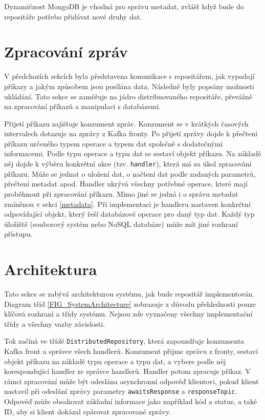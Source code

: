 Dynamičnost MongoDB je vhodná pro správu metadat, zvlášť když bude do repositáře potřeba přidávat nové druhy dat.

\section{Zpracování zpráv}
V předchozích sekcích byla představena komunikace s repositářem, jak vypadají příkazy a jakým způsobem jsou posílána data. Následně byly popsány možnosti ukládání. Tato sekce se zaměřuje na jádro distribuovaného repositáře, převážně na zpracování příkazů a manipulaci s  databázemi.

Přijetí příkazu zajišťuje konzument zpráv. Konzument se v krátkých časových intervalech dotazuje na zprávy z Kafka fronty. Po přijetí zprávy dojde k přečtení příkazu určeného typem operace a typem dat společně s dodatečnými informacemi. Podle typu operace a typu dat se sestaví objekt příkazu. Na základě něj dojde k výběru konkrétní akce (tzv. \texttt{handler}), která má za úkol zpracování příkazu. Může se jednat o uložení dat, o načtení dat podle zadaných parametrů, přečtení metadat apod. Handler ukrývá všechny potřebné operace, které mají proběhnout při zpracování příkazu. Mimo jiné se jedná i o správu metadat zmíněnou v sekci \ref{metadata}. Při implementaci je handleru nastaven konkrétní odpovídající objekt, který řeší databázové operace pro daný typ dat. Každý typ úložiště (souborový systém nebo NoSQL databáze) může mít jiné rozhraní přístupu.

\section{Architektura} \label{archSection}
Tato sekce se zabývá architekturou systému, jak bude repositář implementován. Diagram tříd \ref{FIG_SystemArchitecture} zobrazuje z důvodu přehlednosti pouze klíčová rozhraní a třídy systému. Nejsou zde vyznačeny všechny implementační třídy a všechny vazby závislosti.

Tok začíná ve třídě \texttt{DistributedRepository}, která zapouzdřuje konzumenta Kafka front a správce všech handlerů. Konzument přijme zprávu z fronty, sestaví objekt příkazu na základě typu operace a typu dat, a vybere podle něj korespondující handler ze správce handlerů. Handler potom zpracuje příkaz. V rámci zpracování může být odeslána asynchronní odpověď klientovi, pokud klient nastavil při odeslání zprávy parametry \texttt{awaitsResponse} a \texttt{responseTopic}. Odpověď může obsahovat základní informace jako například kód a status, a také ID, aby si klient dokázal spárovat zpracované zprávy.

